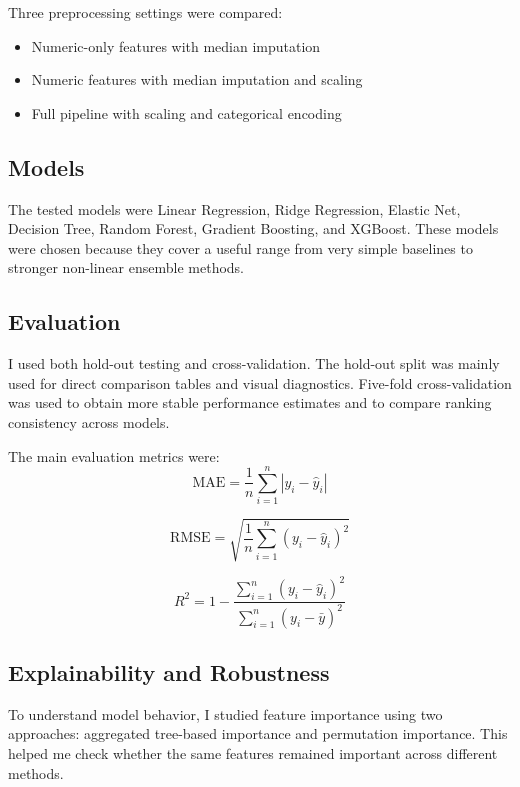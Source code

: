 \documentclass[conference]{IEEEtran}
\begin{document}
Three preprocessing settings were compared:
\begin{itemize}
  \item Numeric-only features with median imputation
  \item Numeric features with median imputation and scaling
  \item Full pipeline with scaling and categorical encoding
\end{itemize}

\subsection{Models}
The tested models were Linear Regression, Ridge Regression, Elastic Net, Decision Tree, Random Forest, Gradient Boosting, and XGBoost. These models were chosen because they cover a useful range from very simple baselines to stronger non-linear ensemble methods.

\subsection{Evaluation}
I used both hold-out testing and cross-validation. The hold-out split was mainly used for direct comparison tables and visual diagnostics. Five-fold cross-validation was used to obtain more stable performance estimates and to compare ranking consistency across models.

The main evaluation metrics were:
\begin{equation}
\mathrm{MAE} = \frac{1}{n}\sum_{i=1}^{n}|y_i-\hat{y}_i|
\end{equation}

\begin{equation}
\mathrm{RMSE} = \sqrt{\frac{1}{n}\sum_{i=1}^{n}(y_i-\hat{y}_i)^2}
\end{equation}

\begin{equation}
R^2 = 1 - \frac{\sum_{i=1}^{n}(y_i-\hat{y}_i)^2}{\sum_{i=1}^{n}(y_i-\bar{y})^2}
\end{equation}

\subsection{Explainability and Robustness}
To understand model behavior, I studied feature importance using two approaches: aggregated tree-based importance and permutation importance. This helped me check whether the same features remained important across different methods.
\end{document}
